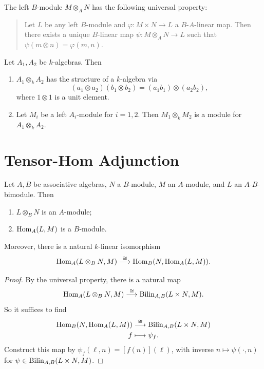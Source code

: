\begin{prop}
  The left $B$-module $M \otimes_A N$
  has the following universal property:
  \begin{quote}
    Let $L$ be any left $B$-module
    and $\varphi : M \times N \to L$
    a $B$-$A$-linear map. Then there
    exists a unique $B$-linear map
    $\psi : M \otimes_A N \to L$
    such that $\psi(m \otimes n) = \varphi(m, n)$.
  \end{quote}
\end{prop}

\begin{example}
  Let $A_1, A_2$ be $k$-algebras. Then
  \begin{enumerate}
    \item $A_1 \otimes_k A_2$ has
      the structure of a $k$-algebra via
      \[
        (a_1 \otimes a_2)(b_1 \otimes b_2) = (a_1 b_1) \otimes (a_2 b_2),
      \]
      where $1 \otimes 1$ is a unit element.
    \item Let $M_i$ be a left $A_i$-module
      for $i = 1, 2$. Then
      $M_1 \otimes_k M_2$ is a module
      for $A_1 \otimes_k A_2$.
  \end{enumerate}
\end{example}

\section{Tensor-Hom Adjunction}
\begin{prop}
  Let $A, B$ be associative algebras,
  $N$ a $B$-module, $M$ an $A$-module,
  and $L$ an $A$-$B$-bimodule. Then
  \begin{enumerate}
    \item $L \otimes_B N$ is an
      $A$-module;
    \item $\operatorname{Hom}_A(L, M)$ is a
      $B$-module.
  \end{enumerate}
  Moreover, there is a natural
  $k$-linear isomorphism
  \[
    \operatorname{Hom}_A(L \otimes_B N, M) \overset{\cong}{\longrightarrow} \operatorname{Hom}_B(N, \operatorname{Hom}_A(L, M)).
  \]
\end{prop}

\begin{proof}
  By the universal property, there is a
  natural map
  \[
    \operatorname{Hom}_A(L \otimes_B N, M)
    \overset{\cong}{\longrightarrow} \operatorname{Bilin}_{A, B}(L \times N, M).
  \]
  So it suffices to find
  \begin{align*}
    \operatorname{Hom}_B(N, \operatorname{Hom}_A(L, M))
    &\overset{\cong}{\longrightarrow} \operatorname{Bilin}_{A, B}(L \times N, M) \\
    f &\longmapsto \psi_f.
  \end{align*}
  Construct this map by
  $\psi_f(\ell, n) = [f(n)](\ell)$, with
  inverse $n \mapsto \psi(\cdot, n)$
  for $\psi \in \operatorname{Bilin}_{A, B}(L \times N, M)$.
\end{proof}

